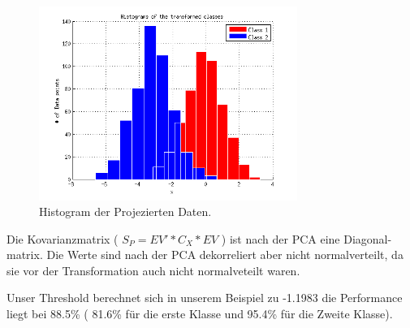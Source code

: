 \begin{figure}[h!]
  \begin{center}
    \includegraphics[width=0.75\textwidth]{./figures/4_Histogram}
    \caption{Histogram der Projezierten Daten.}
    \label{fig:4_Histogram}
  \end{center}
\end{figure}


Die Kovarianzmatrix ( $S_P = EV' * C_X * EV$ ) ist nach der PCA eine Diagonal-matrix. Die Werte sind nach der PCA dekorreliert aber nicht normalverteilt, da sie vor der Transformation auch nicht normalveteilt waren.\newline

Unser Threshold berechnet sich in unserem Beispiel zu -1.1983 die Performance liegt bei 88.5\% ( 81.6\% für die erste Klasse und 95.4\% für die Zweite Klasse).

